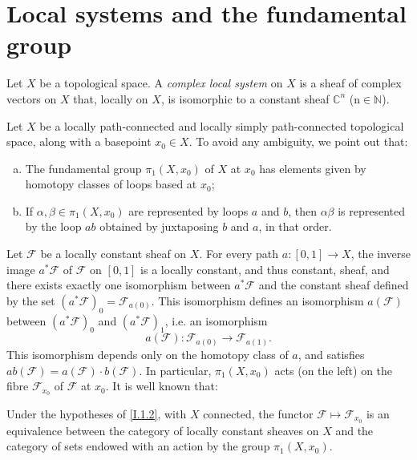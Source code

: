\documentclass{report}
\theoremstyle{plain}
\newenvironment{proposition}[1]
    {\renewcommand\theinnercustomproposition{#1}\innercustomproposition}
    {\endinnercustomproposition}
\theoremstyle{definition}
\newenvironment{definition}[1]
    {\renewcommand\theinnercustomdefinition{#1}\innercustomdefinition}
    {\endinnercustomdefinition}
\newenvironment{env}[1]
    {\renewcommand\theinnercustomenv{#1}\innercustomenv}
    {\endinnercustomenv}
\newcommand{\sh}[1]{{\mathscr{#1}}}
\begin{document}
\section{Local systems and the fundamental group}
\label{I.1}

\begin{definition}{1.1}
\label{I.1.1}
  Let $X$ be a topological space.
  A \emph{complex local system} on $X$ is a sheaf of complex vectors on $X$ that, locally on $X$, is isomorphic to a constant sheaf $\mathbb{C}^n$ (n$\in\mathbb{N}$).
\end{definition}

\begin{env}{1.2}
\label{I.1.2}
  Let $X$ be a locally path-connected and locally simply path-connected topological space, along with a basepoint $x_0\in X$.
  To avoid any ambiguity, we point out that:
  \begin{enumerate}[a)]
    \item The fundamental group $\pi_1(X,x_0)$ of $X$ at $x_0$ has elements given by homotopy classes of loops based at $x_0$;
    \item If $\alpha,\beta\in\pi_1(X,x_0)$ are represented by loops $a$ and $b$, then $\alpha\beta$ is represented by the loop $ab$ obtained by juxtaposing $b$ and $a$, in that order.
  \end{enumerate}

  Let $\sh{F}$ be a locally constant sheaf on $X$.
  For every path $a\colon[0,1]\to X$, the inverse image $a^*\sh{F}$ of $\sh{F}$ on $[0,1]$ is a locally constant, and thus constant, sheaf, and there exists exactly one isomorphism between $a^*\sh{F}$ and the constant sheaf defined by the set $(a^*\sh{F})_0 = \sh{F}_{a(0)}$.
  This isomorphism defines an isomorphism $a(\sh{F})$ between $(a^*\sh{F})_0$ and $(a^*\sh{F})_1$, i.e. an isomorphism
  \[
    a(\sh{F})\colon \sh{F}_{a(0)} \to \sh{F}_{a(1)}.
  \]
  This isomorphism depends only on the homotopy class of $a$, and satisfies $ab(\sh{F}) = a(\sh{F})\cdot b(\sh{F})$.
  In particular, $\pi_1(X,x_0)$ acts (on the left) on the fibre $\sh{F}_{x_0}$ of $\sh{F}$ at $x_0$.
  It is well known that:
\end{env}

\begin{proposition}{1.3}
\label{I.1.3}
  Under the hypotheses of \cref{I.1.2}, with $X$ connected, the functor $\sh{F}\mapsto\sh{F}_{x_0}$ is an equivalence between the category of locally constant sheaves on $X$ and the category of sets endowed with an action by the group $\pi_1(X,x_0)$.
\end{proposition}
\end{document}
